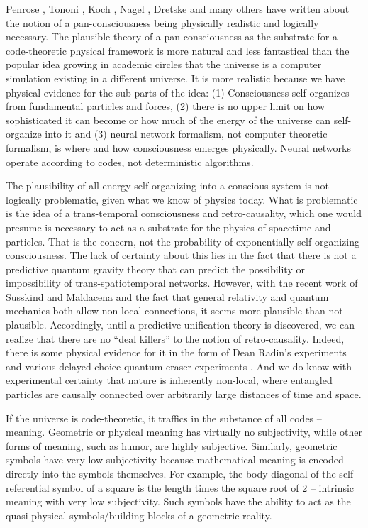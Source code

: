 \documentclass[submission,copyright,creativecommons]{eptcs}
\begin{document}
Penrose \cite{hameroff2014consciousness}, Tononi \cite{tononi2012integrated}, Koch \cite{koch2012consciousness}, Nagel \cite{nagel2012mortal}, Dretske \cite{dretske1997naturalizing} and many others have written about the notion of a pan-consciousness being physically realistic and logically necessary. The plausible theory of a pan-consciousness as the substrate for a code-theoretic physical framework is more natural and less fantastical than the popular idea growing in academic circles that the universe is a computer simulation existing in a different universe. It is more realistic because we have physical evidence for the sub-parts of the idea: (1) Consciousness self-organizes from fundamental particles and forces, (2) there is no upper limit on how sophisticated it can become or how much of the energy of the universe can self-organize into it and (3) neural network formalism, not computer theoretic formalism, is where and how consciousness emerges physically. Neural networks operate according to codes, not deterministic algorithms.

The plausibility of all energy self-organizing into a conscious system is not logically problematic, given what we know of physics today. What is problematic is the idea of a trans-temporal consciousness and retro-causality, which one would presume is necessary to act as a substrate for the physics of spacetime and particles. That is the concern, not the probability of exponentially self-organizing consciousness. The lack of certainty about this lies in the fact that there is not a predictive quantum gravity theory that can predict the possibility or impossibility of trans-spatiotemporal networks. However, with the recent work of Susskind \cite{susskind2016addendum} and Maldacena \cite{maldacena2016black} and the fact that general relativity and quantum mechanics both allow non-local connections, it seems more plausible than not plausible. Accordingly, until a predictive unification theory is discovered, we can realize that there are no “deal killers” to the notion of retro-causality. Indeed, there is some physical evidence for it in the form of Dean Radin’s experiments \cite{radin_electrodermal_2004} and various delayed choice quantum eraser experiments \cite{peruzzo2012quantum}. And we do know with experimental certainty that nature is inherently non-local, where entangled particles are causally connected over arbitrarily large distances of time and space.

If the universe is code-theoretic, it traffics in the substance of all codes -- meaning. Geometric or physical meaning has virtually no subjectivity, while other forms of meaning, such as humor, are highly subjective. Similarly, geometric symbols have very low subjectivity because mathematical meaning is encoded directly into the symbols themselves\cite{irwin2017toward}. For example, the body diagonal of the self-referential symbol of a square is the length times the square root of 2 -- intrinsic meaning with very low subjectivity. Such symbols have the ability to act as the quasi-physical symbols/building-blocks of a geometric reality.
\end{document}
